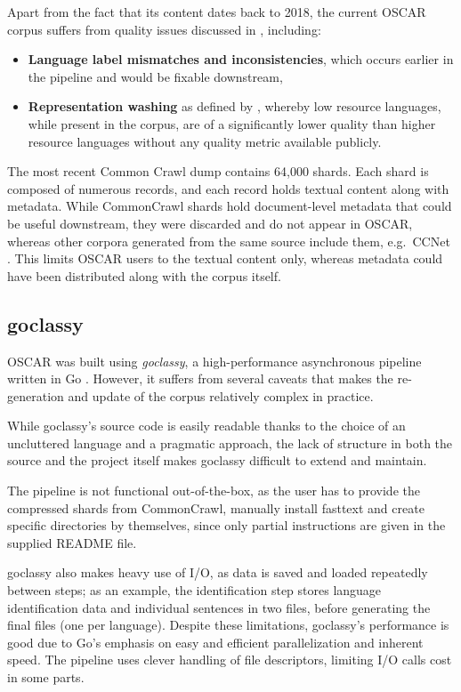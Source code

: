 Apart from the fact that its content dates back to 2018, the current OSCAR corpus suffers from quality issues discussed in \citep{caswell-etal-2020-language,caswell_quality_2021}, including:

\begin{itemize}
    \item \textbf{Language label mismatches and inconsistencies}, which occurs earlier in the pipeline and would be fixable downstream,
    \item \textbf{Representation washing} as defined by \citet{caswell_quality_2021}, whereby low resource languages, while present in the corpus, are of a significantly lower quality than higher resource languages without any quality metric available publicly.
\end{itemize}

The most recent Common Crawl dump contains 64,000 shards. Each shard is composed of numerous records, and each record holds textual content along with metadata. While CommonCrawl shards hold document-level metadata that could be useful downstream, they were discarded and do not appear in OSCAR, whereas other corpora generated from the same source include them, e.g.~CCNet \citep{wenzek-etal-2020-ccnet}. This limits OSCAR users to the textual content only, whereas metadata could have been distributed along with the corpus itself.

\subsection{goclassy}

OSCAR was built using \emph{goclassy}, a high-performance asynchronous pipeline written in Go \citep{ortiz-suarez-etal-2019-asynchronous}. However, it suffers from several caveats that makes the re-generation and update of the corpus relatively complex in practice.

While goclassy's source code is easily readable thanks to the choice of an uncluttered language and a pragmatic approach, the lack of structure in both the source and the project itself makes goclassy difficult to extend and maintain.

The pipeline is not functional out-of-the-box, as the user has to provide the compressed shards from CommonCrawl, manually install fasttext \citep{joulin-etal-2016-fasttex,joulin-etal-2017-bag} and create specific directories by themselves, since only partial instructions are given in the supplied README file.

goclassy also makes heavy use of I/O, as data is saved and loaded repeatedly between steps; as an example, the identification step stores language identification data and individual sentences in two files, before generating the final files (one per language). Despite these limitations, goclassy's performance is good due to Go's emphasis on easy and efficient parallelization and inherent speed. The pipeline uses clever handling of file descriptors, limiting I/O calls cost in some parts.

